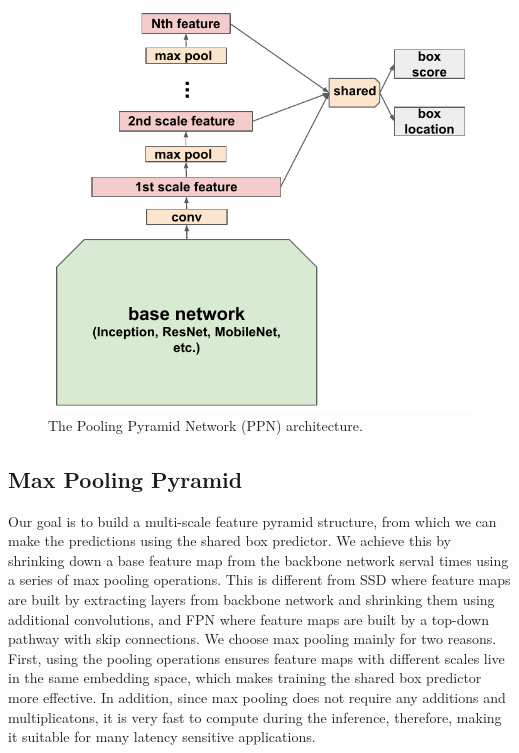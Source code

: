 \documentclass[10pt,twocolumn,letterpaper]{article}
\begin{document}
\begin{figure}[t]
\begin{center}
\includegraphics[width=0.8\linewidth]{figure/ppn.pdf}
\end{center}
\caption{
The Pooling Pyramid Network (PPN) architecture.
}
\label{fig:ppn}
\end{figure}

\subsection{Max Pooling Pyramid}

Our goal is to build a multi-scale feature pyramid structure, from which we can make the predictions using the shared box predictor.
We achieve this by shrinking down a base feature map from the backbone network serval times using a series of max pooling operations.
This is different from
SSD where feature maps are built by extracting layers from backbone network and shrinking them using additional convolutions,
and FPN where feature maps are built by a top-down pathway with skip connections.
We choose max pooling mainly for two reasons.
First, using the pooling operations ensures feature maps with different scales live in the same embedding space,
which makes training the shared box predictor more effective.
In addition, since max pooling does not require any additions and multiplicatons,
it is very fast to compute during the inference,
therefore, making it suitable for many latency sensitive applications.
\end{document}
